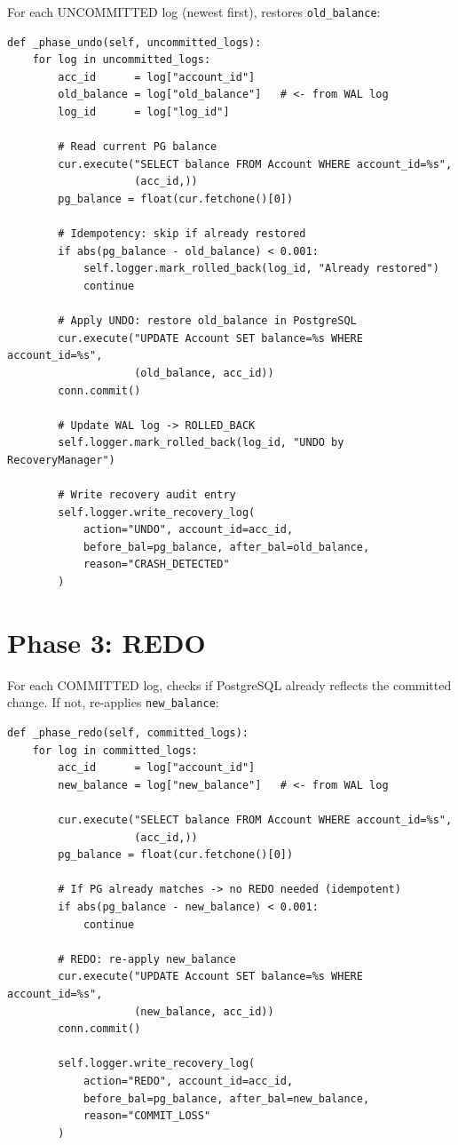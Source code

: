 For each UNCOMMITTED log (newest first), restores \texttt{old\_balance}:

\begin{lstlisting}[style=pythonstyle, caption={UNDO phase --- restore old\_balance}]
def _phase_undo(self, uncommitted_logs):
    for log in uncommitted_logs:
        acc_id      = log["account_id"]
        old_balance = log["old_balance"]   # <- from WAL log
        log_id      = log["log_id"]

        # Read current PG balance
        cur.execute("SELECT balance FROM Account WHERE account_id=%s",
                    (acc_id,))
        pg_balance = float(cur.fetchone()[0])

        # Idempotency: skip if already restored
        if abs(pg_balance - old_balance) < 0.001:
            self.logger.mark_rolled_back(log_id, "Already restored")
            continue

        # Apply UNDO: restore old_balance in PostgreSQL
        cur.execute("UPDATE Account SET balance=%s WHERE account_id=%s",
                    (old_balance, acc_id))
        conn.commit()

        # Update WAL log -> ROLLED_BACK
        self.logger.mark_rolled_back(log_id, "UNDO by RecoveryManager")

        # Write recovery audit entry
        self.logger.write_recovery_log(
            action="UNDO", account_id=acc_id,
            before_bal=pg_balance, after_bal=old_balance,
            reason="CRASH_DETECTED"
        )
\end{lstlisting}

\section{Phase 3: REDO}

For each COMMITTED log, checks if PostgreSQL already reflects the committed
change. If not, re-applies \texttt{new\_balance}:

\begin{lstlisting}[style=pythonstyle, caption={REDO phase --- re-apply new\_balance if PG state is wrong}]
def _phase_redo(self, committed_logs):
    for log in committed_logs:
        acc_id      = log["account_id"]
        new_balance = log["new_balance"]   # <- from WAL log

        cur.execute("SELECT balance FROM Account WHERE account_id=%s",
                    (acc_id,))
        pg_balance = float(cur.fetchone()[0])

        # If PG already matches -> no REDO needed (idempotent)
        if abs(pg_balance - new_balance) < 0.001:
            continue

        # REDO: re-apply new_balance
        cur.execute("UPDATE Account SET balance=%s WHERE account_id=%s",
                    (new_balance, acc_id))
        conn.commit()

        self.logger.write_recovery_log(
            action="REDO", account_id=acc_id,
            before_bal=pg_balance, after_bal=new_balance,
            reason="COMMIT_LOSS"
        )
\end{lstlisting}

